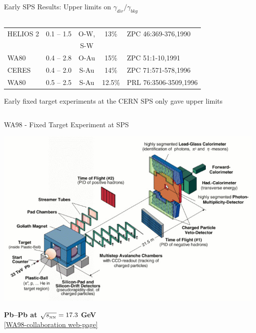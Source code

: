 \documentclass[aspectratio=169,10pt]{beamer}
\begin{document}
\begin{frame}{Early SPS Results: Upper limits on $\gamma_{dir}/\gamma_{bkg}$}
\begin{columns}
\begin{column}{10cm}
\begin{table}
\begin{tabular}{lcccl}
        HELIOS 2  &0.1 – 1.5 & O-W, &  13\% & ZPC 46:369-376,1990\\
                 &          & S-W \\
        WA80  & 0.4 – 2.8 & O-Au & 15\% & ZPC 51:1-10,1991\\
        CERES & 0.4 – 2.0 & S-Au & 14\% & ZPC 71:571-578,1996 \\
        WA80  & 0.5 – 2.5 & S-Au & 12.5\% & PRL 76:3506-3509,1996\\ \bottomrule
       \end{tabular}
      \end{table}
      \normalsize
      \begin{center}
        Early fixed target experiments at the CERN SPS only gave upper limits
      \end{center}
     \end{column}
    \end{columns}
  \end{frame}

  \begin{frame}{WA98 - Fixed Target Experiment at SPS}
    \vspace{-5cm} 
    \begin{center}
      \includegraphics[height=0.85\textheight]{EMLectureWeek2018/wa98setup96.jpg}\\
    \end{center}
    \vspace{-7.5cm}
    \textbf{\hspace{1cm} Pb--Pb at $\sqrt{s_{_{\text{\tiny NN}}}} = 17.3$ GeV}\\
    \hspace{1.15cm}\tiny \href{https://wa98.web.cern.ch/WA98/setup.shtml}{[WA98-collaboration web-page]}%
  \end{frame}
  
\end{document}
